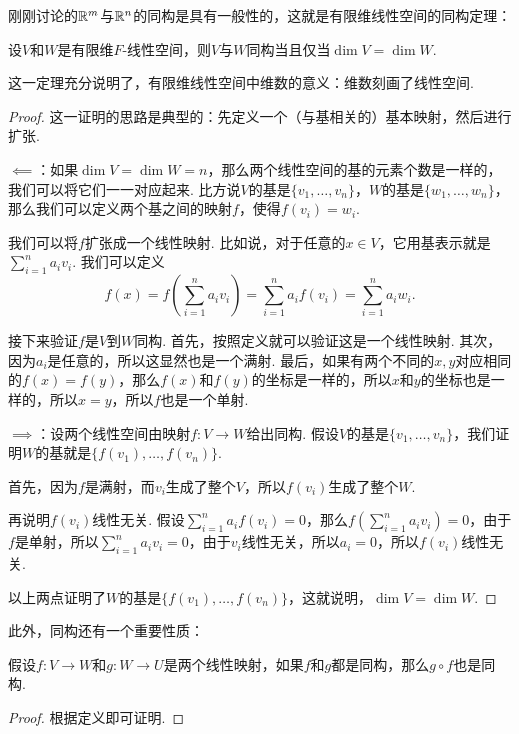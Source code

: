 刚刚讨论的$\mathbb{R}^m$与$\mathbb{R}^n$的同构是具有一般性的，这就是有限维线性空间的同构定理：

\begin{theorem}[有限维线性空间的同构定理]\label{theorem:finite-dim-linear-space-isomorphism}
设$V$和$W$是有限维$F$-线性空间，则$V$与$W$同构当且仅当$\dim V=\dim W$. 
\end{theorem}
这一定理充分说明了，有限维线性空间中维数的意义：维数刻画了线性空间. 
\begin{proof}
    这一证明的思路是典型的：先定义一个（与基相关的）基本映射，然后进行扩张. 
    
    $\impliedby$：如果$\dim V=\dim W=n$，那么两个线性空间的基的元素个数是一样的，我们可以将它们一一对应起来. 比方说$V$的基是$\{v_1,\dots,v_n\}$，$W$的基是$\{w_1,\dots,w_n\}$，那么我们可以定义两个基之间的映射$f$，使得$f(v_i)=w_i$. 
    
    我们可以将$f$扩张成一个线性映射. 比如说，对于任意的$x\in V$，它用基表示就是$\sum_{i=1}^n a_iv_i$. 我们可以定义
    \[f(x)=f\left(\sum_{i=1}^n a_iv_i\right)=\sum_{i=1}^n a_if(v_i)=\sum_{i=1}^n a_iw_i.\]

    接下来验证$f$是$V$到$W$同构. 首先，按照定义就可以验证这是一个线性映射. 其次，因为$a_i$是任意的，所以这显然也是一个满射. 最后，如果有两个不同的$x,y$对应相同的$f(x)=f(y)$，那么$f(x)$和$f(y)$的坐标是一样的，所以$x$和$y$的坐标也是一样的，所以$x=y$，所以$f$也是一个单射. 

    $\implies$：设两个线性空间由映射$f:V\to W$给出同构. 假设$V$的基是$\{v_1,\dots,v_n\}$，我们证明$W$的基就是$\{f(v_1),\dots,f(v_n)\}$. 
    
    首先，因为$f$是满射，而$v_i$生成了整个$V$，所以$f(v_i)$生成了整个$W$. 
    
    再说明$f(v_i)$线性无关. 假设$\sum_{i=1}^n a_if(v_i)=0$，那么$f(\sum_{i=1}^n a_iv_i)=0$，由于$f$是单射，所以$\sum_{i=1}^n a_iv_i=0$，由于$v_i$线性无关，所以$a_i=0$，所以$f(v_i)$线性无关. 
    
    以上两点证明了$W$的基是$\{f(v_1),\dots,f(v_n)\}$，这就说明，$\dim V=\dim W$. 
\end{proof}

此外，同构还有一个重要性质：
\begin{proposition}\label{proposition:isomorphism-composition}
假设$f:V\to W$和$g:W\to U$是两个线性映射，如果$f$和$g$都是同构，那么$g\circ f$也是同构. 
\end{proposition}
\begin{proof}
    根据定义即可证明.     
\end{proof}



